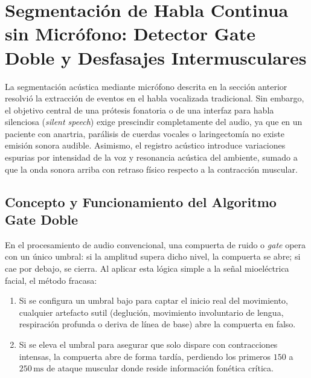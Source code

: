 \documentclass[11pt,a4paper,openany]{book}
\theoremstyle{definition}
\begin{document}
\section{Segmentación de Habla Continua sin Micrófono: Detector Gate Doble y Desfasajes Intermusculares}
\label{sec:gate_doble}

La segmentación acústica mediante micrófono descrita en la sección anterior resolvió la extracción de eventos en el habla vocalizada tradicional. Sin embargo, el objetivo central de una prótesis fonatoria o de una interfaz para habla silenciosa (\textit{silent speech}) exige prescindir completamente del audio, ya que en un paciente con anartria, parálisis de cuerdas vocales o laringectomía no existe emisión sonora audible. Asimismo, el registro acústico introduce variaciones espurias por intensidad de la voz y resonancia acústica del ambiente, sumado a que la onda sonora arriba con retraso físico respecto a la contracción muscular.

\subsection{Concepto y Funcionamiento del Algoritmo Gate Doble}
\label{subsec:concepto_gate_doble}

En el procesamiento de audio convencional, una compuerta de ruido o \textit{gate} opera con un único umbral: si la amplitud supera dicho nivel, la compuerta se abre; si cae por debajo, se cierra. Al aplicar esta lógica simple a la señal mioeléctrica facial, el método fracasa:
\begin{enumerate}
    \item Si se configura un umbral bajo para captar el inicio real del movimiento, cualquier artefacto sutil (deglución, movimiento involuntario de lengua, respiración profunda o deriva de línea de base) abre la compuerta en falso.
    \item Si se eleva el umbral para asegurar que solo dispare con contracciones intensas, la compuerta abre de forma tardía, perdiendo los primeros $150$ a $250\,\text{ms}$ de ataque muscular donde reside información fonética crítica.
\end{enumerate}
\end{document}
